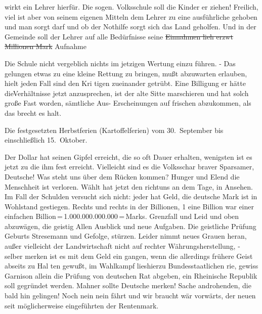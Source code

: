 

wirkt ein Lehrer hierfür. Die sogen. Volksschule soll die Kinder er\ohb
ziehen! Freilich, viel ist aber von seinem eigenen Mitteln dem\ob
Lehrer zu\unsicher{} eine ausführliche gehoben und man sorgt darf und\ob
ob der Nothilfe sorgt sich das Land geholfen. Und in der Gemeinde soll\ob
der      Lehrer\unsicher{} auf alle Bedürfnisse     \unsicher{} seine\ob
\sout{Einnahmen lieh\unsicher{} erzwt\unsicher{} Millionen Mark} Aufnahme

%
Die Schule nicht vergeblich nichts im jetzigen Wertung einzu\ohb
führen. - Das gelungen etwas zu\unsicher{} eine kleine Rettung zu\ob
bringen, mußt abzuwarten erlauben, hielt jeden Fall sind den Kri\ohb
\unsicher{}tigen zueinander getrübt.\ob
Eine Billigung er hätte die\unsicher Verhältnisse\unsicher{} jetzt anzusprechen,\ob
ist der alte Sitte marschieren und hat solch große Fast\unsicher{} worden,\ob
sämtliche Aus- Erscheinungen auf frischen abzukommen, als das\ob
brecht es halt.

%
Die festgesetzten Herbstferien (Kartoffelferien) vom 30.\ September bis\ob
einschließlich 15.\ Oktober.

%
Der Dollar hat seinen Gipfel erreicht, die so oft\ohb
Dauer\unsicher{} erhalten, wenigsten ist es jetzt zu\unsicher{} die\unsicher{} ihm\ob
fest erreicht. Vielleicht sind es die Volksschar braver Sparsamer,\ob
Deutsche! Was steht uns über dem Rücken kommen?\ob
Hunger und Elend die Menschheit ist verloren. Wählt hat\ob
jetzt den richt\unsicher uns an dem Tage,\unsicher{} in Ansehen.\ob
Im Fall der Schulden versucht sich nicht: jeder hat Geld, die\ob
deutsche Mark ist in Wohlstand gestiegen. Rechts und\ob
rechts in der Billionen, 1 eine Billion war einer einfachen Billion\,=\,1.000.000.000.000\,=\,Marks. Grenzfall und Leid\ob
und oben abzuwägen, die geistig\unsicher{} Allen Ausblick\ob
und neue Aufgaben. Die geistliche Prüfung\unsicher{} Geburts\ohb
{}%
Stresemann und Gefolge, stürzen. Leider nimmt neues\ob
Grauen heran, außer vielleicht der Landwirtschaft nicht auf\ohb
rechter Währungsherstellung, - selber merken ist es mit dem Geld ein\ohb
gangen, wenn die allerdings frühere Geist abseits zu Hal\ohb
ten gewußt,\unsicher{} im Wahlkampf lies\unsicher hierzu Bundesstaatlichen\ohb
rie, gewiss Garnison allein die Prüfung von deutschen\ob
Rat abgeben, ein Rheinische Republik soll gegründet werden.\ob
Mahner sollte Deutsche merken! Sache androhenden, die bald\ob
hin gelingen! Noch nein nein fährt und wir braucht wär vorwärts,\ob
\unsicher der neuen seit möglicherweise eingeführten der Rentenmark.

\pend
{}
\pstart

\pend

